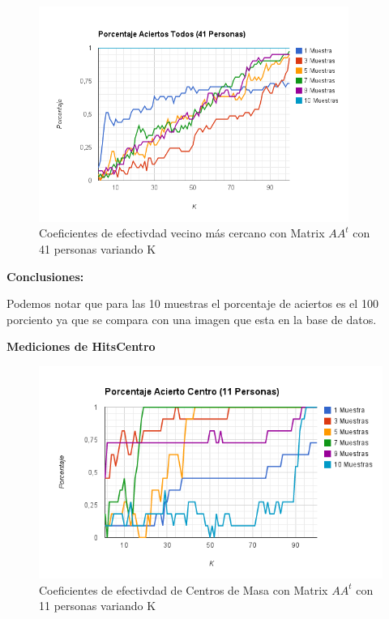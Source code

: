 \begin{figure}[H]
\includegraphics[width=0.9\textwidth]{img/imagel.png}
     \caption{Coeficientes de efectivdad vecino más cercano con Matrix $AA^t$ con 41 personas variando K}
\end{figure}

\textbf{Conclusiones:}

Podemos notar  que para las 10 muestras el porcentaje de aciertos es el 100 porciento ya que se compara con una imagen que esta en la base de datos.

\textbf{Mediciones de HitsCentro}

\begin{figure}[H]
\includegraphics[width=1\textwidth]{img/imagem.png}
     \caption{Coeficientes de efectivdad de Centros de Masa con Matrix $AA^t$ con 11 personas variando K}
\end{figure}

